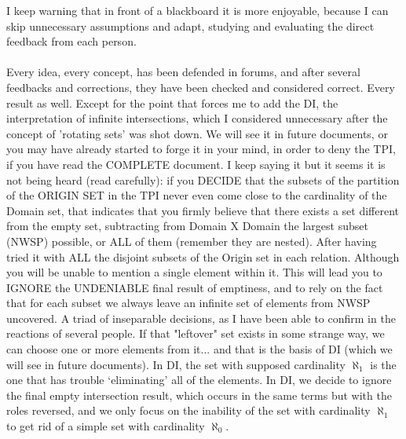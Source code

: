 	\noindent
	I keep warning that in front of a blackboard it is more enjoyable, because I can skip unnecessary assumptions and adapt, studying and evaluating the direct feedback from each person.\\\\
	
	\noindent
	Every idea, every concept, has been defended in forums, and after several feedbacks and corrections, they have been checked and considered correct. Every result as well. Except for the point that forces me to add the DI, the interpretation of infinite intersections, which I considered unnecessary after the concept of 'rotating sets' was shot down. We will see it in future documents, or you may have already started to forge it in your mind, in order to deny the TPI, if you have read the COMPLETE document. I keep saying it but it seems it is not being heard (read carefully): if you DECIDE that the subsets of the partition of the ORIGIN SET in the TPI never even come close to the cardinality of the Domain set, that indicates that you firmly believe that there exists a set different from the empty set, subtracting from Domain X Domain the largest subset (NWSP) possible, or ALL of them (remember they are nested). After having tried it with ALL the disjoint subsets of the Origin set in each relation. Although you will be unable to mention a single element within it. This will lead you to IGNORE the UNDENIABLE final result of emptiness, and to rely on the fact that for each subset we always leave an infinite set of elements from NWSP uncovered. A triad of inseparable decisions, as I have been able to confirm in the reactions of several people. If that "leftover" set exists in some strange way, we can choose one or more elements from it... and that is the basis of DI (which we will see in future documents). In DI, the set with supposed cardinality $\aleph_{1}$ is the one that has trouble `eliminating' all of the elements. In DI, we decide to ignore the final empty intersection result, which occurs in the same terms but with the roles reversed, and we only focus on the inability of the set with cardinality $\aleph_{1}$ to get rid of a simple set with cardinality $\aleph_{0}$.\\\\
	
